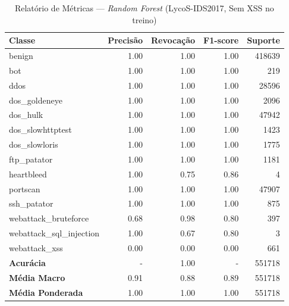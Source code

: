 \begin{table}[H]
    \centering
    \small
    \begin{tabular}{lrrrr}
        \hline
        Classe                    & Precisão & Revocação & F1-score & Suporte \\
        \hline
        benign                    & 1.00     & 1.00      & 1.00     & 418639  \\
        bot                       & 1.00     & 1.00      & 1.00     & 219     \\
        ddos                      & 1.00     & 1.00      & 1.00     & 28596   \\
        dos\_goldeneye            & 1.00     & 1.00      & 1.00     & 2096    \\
        dos\_hulk                 & 1.00     & 1.00      & 1.00     & 47942   \\
        dos\_slowhttptest         & 1.00     & 1.00      & 1.00     & 1423    \\
        dos\_slowloris            & 1.00     & 1.00      & 1.00     & 1775    \\
        ftp\_patator              & 1.00     & 1.00      & 1.00     & 1181    \\
        heartbleed                & 1.00     & 0.75      & 0.86     & 4       \\
        portscan                  & 1.00     & 1.00      & 1.00     & 47907   \\
        ssh\_patator              & 1.00     & 1.00      & 1.00     & 875     \\
        webattack\_bruteforce     & 0.68     & 0.98      & 0.80     & 397     \\
        webattack\_sql\_injection & 1.00     & 0.67      & 0.80     & 3       \\
        webattack\_xss            & 0.00     & 0.00      & 0.00     & 661     \\
        \hline
        \textbf{Acurácia}         & -        & 1.00      & -        & 551718  \\
        \textbf{Média Macro}      & 0.91     & 0.88      & 0.89     & 551718  \\
        \textbf{Média Ponderada}  & 1.00     & 1.00      & 1.00     & 551718  \\
        \hline
    \end{tabular}
    \caption{Relatório de Métricas — \textit{Random Forest} (LycoS-IDS2017, Sem XSS no treino)}
    \label{table:rf_lycos_sem_xss_metricas}
\end{table}
